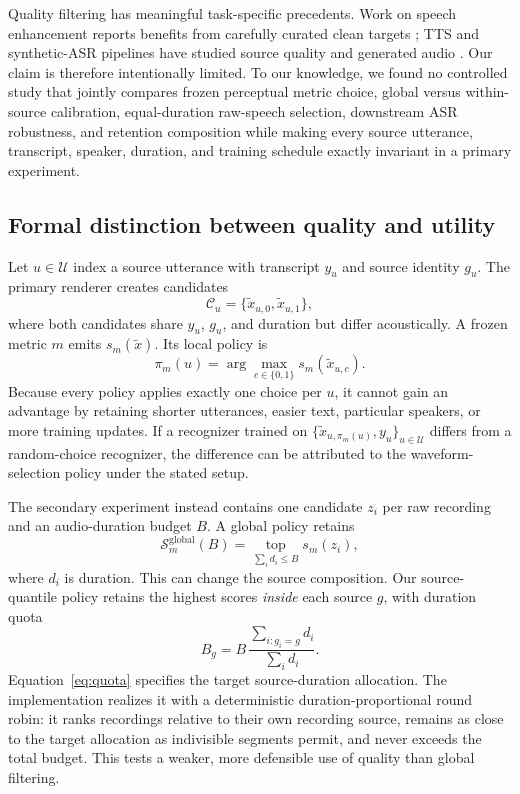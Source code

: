 \documentclass[10pt,twocolumn]{article}
\newcommand{\asr}{\textsc{ASR}}
\begin{document}
Quality filtering has meaningful task-specific precedents. Work on speech enhancement reports benefits from carefully curated clean targets \citep{li2025lessismore}; TTS and synthetic-\asr{} pipelines have studied source quality and generated audio \citep{rossenbach2024ttsasr}. Our claim is therefore intentionally limited. To our knowledge, we found no controlled study that jointly compares frozen perceptual metric choice, global versus within-source calibration, equal-duration raw-speech selection, downstream \asr{} robustness, and retention composition while making every source utterance, transcript, speaker, duration, and training schedule exactly invariant in a primary experiment.

\subsection{Formal distinction between quality and utility}

Let $u \in \mathcal{U}$ index a source utterance with transcript $y_u$ and source identity $g_u$. The primary renderer creates candidates
\begin{equation}
\mathcal{C}_u = \{\tilde{x}_{u,0},\tilde{x}_{u,1}\},
\end{equation}
where both candidates share $y_u$, $g_u$, and duration but differ acoustically. A frozen metric $m$ emits $s_m(\tilde{x})$. Its local policy is
\begin{equation}
\pi_m(u) = \arg\max_{c \in \{0,1\}} s_m(\tilde{x}_{u,c}).
\label{eq:pair}
\end{equation}
Because every policy applies exactly one choice per $u$, it cannot gain an advantage by retaining shorter utterances, easier text, particular speakers, or more training updates. If a recognizer trained on $\{\tilde{x}_{u,\pi_m(u)},y_u\}_{u\in\mathcal{U}}$ differs from a random-choice recognizer, the difference can be attributed to the waveform-selection policy under the stated setup.

The secondary experiment instead contains one candidate $z_i$ per raw recording and an audio-duration budget $B$. A global policy retains
\begin{equation}
\mathcal{S}^{\mathrm{global}}_m(B)=
\operatorname*{top}_{\sum_i d_i \leq B} s_m(z_i),
\label{eq:global}
\end{equation}
where $d_i$ is duration. This can change the source composition. Our source-quantile policy retains the highest scores \emph{inside} each source $g$, with duration quota
\begin{equation}
B_g=B\,\frac{\sum_{i:g_i=g}d_i}{\sum_i d_i}.
\label{eq:quota}
\end{equation}
Equation~\ref{eq:quota} specifies the target source-duration allocation. The implementation realizes it with a deterministic duration-proportional round robin: it ranks recordings relative to their own recording source, remains as close to the target allocation as indivisible segments permit, and never exceeds the total budget. This tests a weaker, more defensible use of quality than global filtering.
\end{document}
